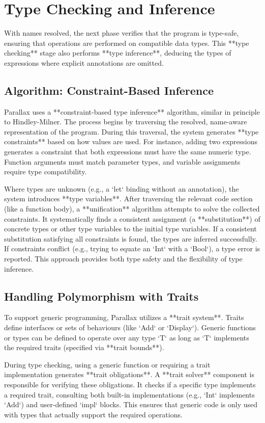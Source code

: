 \section{Type Checking and Inference} %
With names resolved, the next phase verifies that the program is type-safe, ensuring that operations are performed on compatible data types. This **type checking** stage also performs **type inference**, deducing the types of expressions where explicit annotations are omitted.

\subsection{Algorithm: Constraint-Based Inference} %
Parallax uses a **constraint-based type inference** algorithm, similar in principle to Hindley-Milner. The process begins by traversing the resolved, name-aware representation of the program. During this traversal, the system generates **type constraints** based on how values are used. For instance, adding two expressions generates a constraint that both expressions must have the same numeric type. Function arguments must match parameter types, and variable assignments require type compatibility.

Where types are unknown (e.g., a `let` binding without an annotation), the system introduces **type variables**. After traversing the relevant code section (like a function body), a **unification** algorithm attempts to solve the collected constraints. It systematically finds a consistent assignment (a **substitution**) of concrete types or other type variables to the initial type variables. If a consistent substitution satisfying all constraints is found, the types are inferred successfully. If constraints conflict (e.g., trying to equate an `Int` with a `Bool`), a type error is reported. This approach provides both type safety and the flexibility of type inference.

\subsection{Handling Polymorphism with Traits} %
To support generic programming, Parallax utilizes a **trait system**. Traits define interfaces or sets of behaviours (like `Add` or `Display`). Generic functions or types can be defined to operate over any type `T` as long as `T` implements the required traits (specified via **trait bounds**).

During type checking, using a generic function or requiring a trait implementation generates **trait obligations**. A **trait solver** component is responsible for verifying these obligations. It checks if a specific type implements a required trait, consulting both built-in implementations (e.g., `Int` implements `Add`) and user-defined `impl` blocks. This ensures that generic code is only used with types that actually support the required operations.

